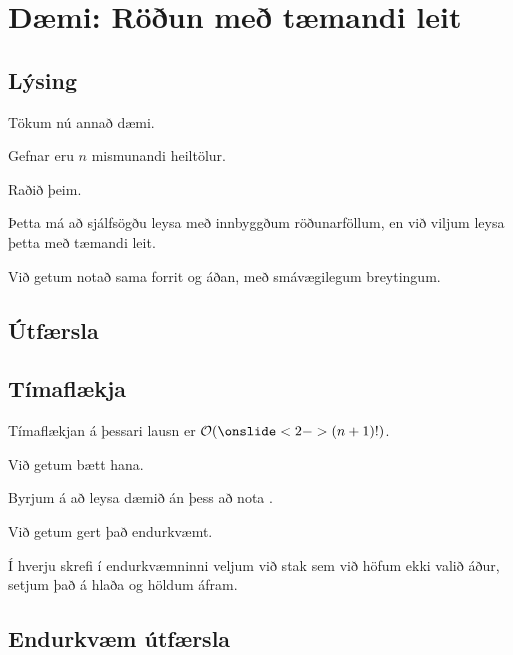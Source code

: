 \section{Dæmi: Röðun með tæmandi leit}
\subsection{Lýsing}
{
    {
        \item<1-> Tökum nú annað dæmi.
        \item<2-> Gefnar eru $n$ mismunandi heiltölur.
        \item<3-> Raðið þeim.
        \item<4-> Þetta má að sjálfsögðu leysa með innbyggðum röðunarföllum, en við viljum leysa þetta með tæmandi leit.
        \item<5-> Við getum notað sama forrit og áðan, með smávægilegum breytingum.
    }
}

\subsection{Útfærsla}
{
}

\subsection{Tímaflækja}
{
    {
        \item<1-> Tímaflækjan á þessari lausn er $\mathcal{O}(\onslide<2->{(n + 1)!})$.
        \item<3-> Við getum bætt hana.
        \item<4-> Byrjum á að leysa dæmið án þess að nota .
        \item<5-> Við getum gert það endurkvæmt.
        \item<6-> Í hverju skrefi í endurkvæmninni veljum við stak sem við höfum ekki valið áður, setjum það á hlaða og höldum áfram.
    }
}

\subsection{Endurkvæm útfærsla}
{
}

